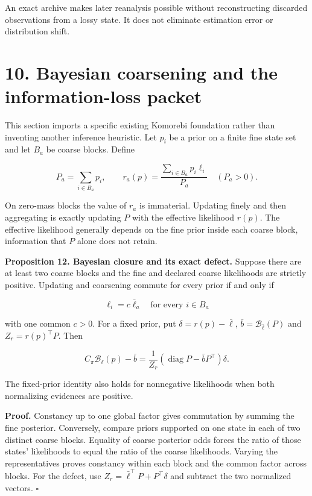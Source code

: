 \documentclass[11pt,letterpaper]{article}
\begin{document}
An exact archive makes later reanalysis possible without reconstructing
discarded observations from a lossy state. It does not eliminate
estimation error or distribution shift.

\section{10. Bayesian coarsening and the information-loss
packet}\label{bayesian-coarsening-and-the-information-loss-packet}

This section imports a specific existing Komorebi foundation rather than
inventing another inference heuristic. Let \(p_i\) be a prior on a
finite fine state set and let \(B_a\) be coarse blocks. Define

\[
P_a=\sum_{i\in B_a}p_i,\qquad
r_a(p)=\frac{\sum_{i\in B_a}p_i\ell_i}{P_a}
\quad(P_a>0).
\]

On zero-mass blocks the value of \(r_a\) is immaterial. Updating finely
and then aggregating is exactly updating \(P\) with the effective
likelihood \(r(p)\). The effective likelihood generally depends on the
fine prior inside each coarse block, information that \(P\) alone does
not retain.

\textbf{Proposition 12. Bayesian closure and its exact defect.} Suppose
there are at least two coarse blocks and the fine and declared coarse
likelihoods are strictly positive. Updating and coarsening commute for
every prior if and only if

\[
\ell_i=c\bar\ell_a\quad\text{for every }i\in B_a
\]

with one common \(c>0\). For a fixed prior, put
\(\delta=r(p)-\bar\ell\), \(\bar b=\mathcal B_{\bar\ell}(P)\) and
\(Z_r=r(p)^\top P\). Then

\[
\boxed{
C_\pi\mathcal B_{\ell}(p)-\bar b
=
\frac{1}{Z_r}\left(\operatorname{diag}P-\bar bP^\top\right)\delta.
}
\]

The fixed-prior identity also holds for nonnegative likelihoods when
both normalizing evidences are positive.

\textbf{Proof.} Constancy up to one global factor gives commutation by
summing the fine posterior. Conversely, compare priors supported on one
state in each of two distinct coarse blocks. Equality of coarse
posterior odds forces the ratio of those states' likelihoods to equal
the ratio of the coarse likelihoods. Varying the representatives proves
constancy within each block and the common factor across blocks. For the
defect, use \(Z_r=\bar\ell^\top P+P^\top\delta\) and subtract the two
normalized vectors. \(\square\)
\end{document}
